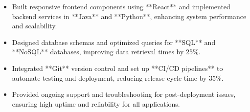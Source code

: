 \par\smallskip
\noindent
\begin{minipage}{20cm}
  \begin{minipage}{9.75cm}
    \begin{itemize}
      \item Built responsive frontend components using **React** and implemented backend services in **Java** and **Python**, enhancing system performance and scalability.
      \item Designed database schemas and optimized queries for **SQL** and **NoSQL** databases, improving data retrieval times by 25\%.
    \end{itemize}
  \end{minipage}
  \hfill
  \begin{minipage}{9.75cm}
    \begin{itemize}
      \item Integrated **Git** version control and set up **CI/CD pipelines** to automate testing and deployment, reducing release cycle time by 35\%.
      \item Provided ongoing support and troubleshooting for post-deployment issues, ensuring high uptime and reliability for all applications.
    \end{itemize}
  \end{minipage}
\end{minipage}
\par\smallskip
\divider

